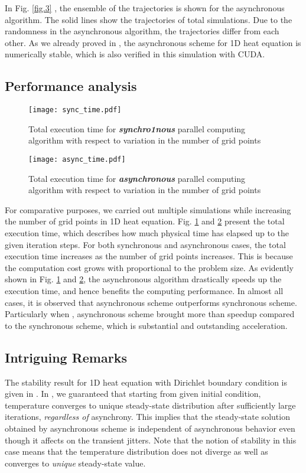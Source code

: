 \documentclass[1p]{elsarticle}
\begin{document}
In Fig. \ref{fig.3} , the ensemble of the trajectories is shown for the asynchronous algorithm. The solid lines show the trajectories of total  simulations. Due to the randomness in the asynchronous algorithm, the trajectories differ from each other. 
As we already proved in \citep{lee2015async}, the asynchronous scheme for 1D heat equation is numerically stable, which is also verified in this simulation with \textsf{CUDA}.


\subsection{Performance analysis}
\begin{figure}
\centering
\texttt{[image: sync\_time.pdf]}\vspace{-0.3in}
\caption{Total execution time for \textbf{\textit{synchro1nous}} parallel computing algorithm with respect to variation in the number of grid points }\label{fig.4}
\end{figure}

\begin{figure}
\centering
\texttt{[image: async\_time.pdf]}\vspace{-0.3in}
\caption{Total execution time for \textbf{\textit{asynchronous}} parallel computing algorithm with respect to variation in the number of grid points }\label{fig.5}
\end{figure}

For comparative purposes, we carried out multiple simulations while increasing the number of grid points in 1D heat equation. Fig. \ref{fig.4} and \ref{fig.5} present the total execution time, which describes how much physical time has elapsed up to the given iteration steps. For both synchronous and asynchronous cases, the total execution time increases as the number of grid points  increases. This is because the computation cost grows with proportional to the problem size. 
As evidently shown in Fig. \ref{fig.4} and \ref{fig.5}, the asynchronous algorithm drastically speeds up the execution time, and hence benefits the computing performance. In almost all cases, it is observed that asynchronous scheme outperforms synchronous scheme. Particularly when , asynchronous scheme brought more than  speedup compared to the synchronous scheme, which is substantial and outstanding acceleration.


\subsection{Intriguing Remarks}
The stability result for 1D heat equation with Dirichlet boundary condition is given in \citep{lee2015async}. In \citep{lee2015async}, we guaranteed that starting from given initial condition, temperature converges to unique steady-state distribution after sufficiently large iterations, \textit{regardless of} asynchrony. This implies that the steady-state solution obtained by asynchronous scheme is independent of asynchronous behavior even though it affects on the transient jitters. Note that the notion of stability in this case means that the temperature distribution does not diverge as well as converges to \textit{unique} steady-state value. 
\end{document}

